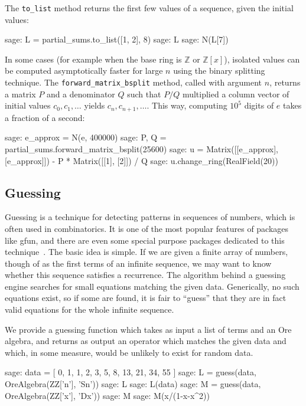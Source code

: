 \documentclass{amsart}
\begin{document}
The \verb|to_list| method returns the first few values of a sequence,
given the initial values:

\begin{sageexample}
  sage: L = partial_sums.to_list([1, 2], 8)
  sage: L
  sage: N(L[7])
\end{sageexample}

In some cases (for example when the base ring is $\mathbb{Z}$ or
$\mathbb{Z}[x]$), isolated values can be
computed asymptotically faster for large $n$ using the binary splitting
technique.
The \verb|forward_matrix_bsplit| method, called with argument $n$,
returns a matrix $P$ and a denominator $Q$ such that $P / Q$ multiplied a
column vector of initial values $c_0, c_1, \ldots$
yields $c_n, c_{n+1}, \ldots$.
This way, computing $10^5$ digits of $e$ takes a fraction of a second:

\begin{sageexample}
  sage: e_approx = N(e, 400000)
  sage: P, Q = partial_sums.forward_matrix_bsplit(25600)
  sage: u = Matrix([[e_approx], [e_approx]]) - P * Matrix([[1], [2]]) / Q
  sage: u.change_ring(RealField(20))
\end{sageexample}

\subsection{Guessing}

Guessing is a technique for detecting patterns in sequences of numbers, which is
often used in combinatorics. It is one of the most popular features of packages
like gfun, and there are even some special purpose packages dedicated to this
technique~\cite{kauers09a,hebisch11}.  The basic idea is simple. If we are given
a finite array of numbers, though of as the first terms of an infinite sequence,
we may want to know whether this sequence satisfies a recurrence. The algorithm
behind a guessing engine searches for small equations matching the given data.
Generically, no such equations exist, so if some are found, it is fair to
``guess'' that they are in fact valid equations for the whole infinite sequence.

We provide a guessing function which takes as input a list of terms and an Ore
algebra, and returns as output an operator which matches the given data and
which, in some measure, would be unlikely to exist for random data.

\begin{sageexample}
  sage: data = [ 0, 1, 1, 2, 3, 5, 8, 13, 21, 34, 55 ]
  sage: L = guess(data, OreAlgebra(ZZ['n'], 'Sn'))
  sage: L
  sage: L(data)
  sage: M = guess(data, OreAlgebra(ZZ['x'], 'Dx'))
  sage: M
  sage: M(x/(1-x-x^2))
\end{sageexample}
\end{document}
